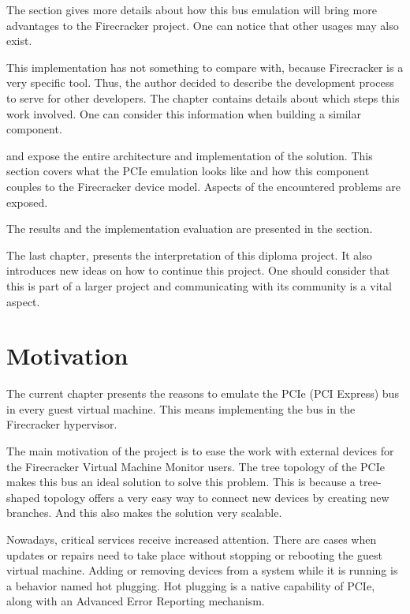 \documentclass[12pt, a4paper]{report}
\begin{document}
The  section gives more details about how this bus emulation will bring more advantages to the Firecracker project. One can notice that other usages may also exist.

This implementation has not something to compare with, because Firecracker is a very specific tool. Thus, the author decided to describe the development process to serve for other developers. The  chapter contains details about which steps this work involved. One can consider this information when building a similar component.

 and  expose the entire architecture and implementation of the solution. This section covers what the PCIe emulation looks like and how this component couples to the Firecracker device model. Aspects of the encountered problems are exposed.

The results and the implementation evaluation are presented in the  section.

The last chapter,  presents the interpretation of this diploma project. It also introduces new ideas on how to continue this project. One should consider that this is part of a larger project and communicating with its community is a vital aspect.


\chapter{Motivation}\label{Motivation}

The current chapter presents the reasons to emulate the PCIe (PCI Express) bus in every guest virtual machine. This means implementing the bus in the Firecracker hypervisor.

The main motivation of the project is to ease the work with external devices for the Firecracker Virtual Machine Monitor users. The tree topology of the PCIe makes this bus an ideal solution to solve this problem. This is because a tree-shaped topology offers a very easy way to connect new devices by creating new branches. And this also makes the solution very scalable.

Nowadays, critical services receive increased attention. There are cases when updates or repairs need to take place without stopping or rebooting the guest virtual machine. Adding or removing devices from a system while it is running is a behavior named hot plugging. Hot plugging is a native capability of PCIe, along with an Advanced Error Reporting mechanism.
\end{document}
